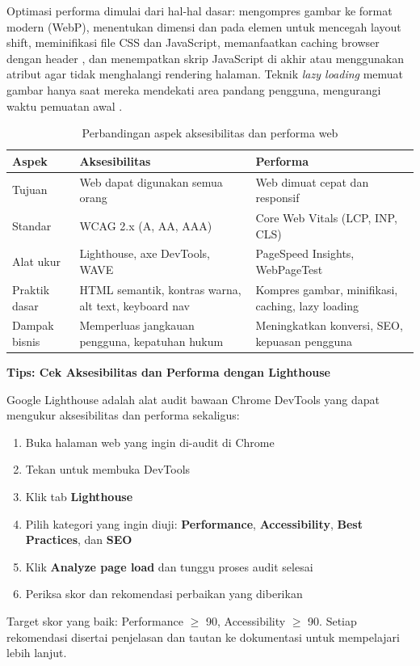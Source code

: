 Optimasi performa dimulai dari hal-hal dasar: mengompres gambar ke format modern (WebP), menentukan dimensi  dan  pada elemen  untuk mencegah layout shift, meminifikasi file CSS dan JavaScript, memanfaatkan caching browser dengan header , dan menempatkan skrip JavaScript di akhir  atau menggunakan atribut  agar tidak menghalangi rendering halaman. Teknik \textit{lazy loading} memuat gambar hanya saat mereka mendekati area pandang pengguna, mengurangi waktu pemuatan awal \cite{mdnToolsTesting}.

\begin{table}[htbp]
\centering
\begin{tabular}{|P{2.5cm}|P{4.5cm}|P{4.5cm}|}
\hline
\textbf{Aspek} & \textbf{Aksesibilitas} & \textbf{Performa} \\
\hline
Tujuan & Web dapat digunakan semua orang & Web dimuat cepat dan responsif \\
\hline
Standar & WCAG 2.x (A, AA, AAA) & Core Web Vitals (LCP, INP, CLS) \\
\hline
Alat ukur & Lighthouse, axe DevTools, WAVE & PageSpeed Insights, WebPageTest \\
\hline
Praktik dasar & HTML semantik, kontras warna, alt text, keyboard nav & Kompres gambar, minifikasi, caching, lazy loading \\
\hline
Dampak bisnis & Memperluas jangkauan pengguna, kepatuhan hukum & Meningkatkan konversi, SEO, kepuasan pengguna \\
\hline
\end{tabular}
\caption{Perbandingan aspek aksesibilitas dan performa web}
\end{table}

\begin{catatan}
\textbf{Tips: Cek Aksesibilitas dan Performa dengan Lighthouse}

Google Lighthouse adalah alat audit bawaan Chrome DevTools yang dapat mengukur aksesibilitas dan performa sekaligus:
\begin{enumerate}
  \item Buka halaman web yang ingin di-audit di Chrome
  \item Tekan  untuk membuka DevTools
  \item Klik tab \textbf{Lighthouse}
  \item Pilih kategori yang ingin diuji: \textbf{Performance}, \textbf{Accessibility}, \textbf{Best Practices}, dan \textbf{SEO}
  \item Klik \textbf{Analyze page load} dan tunggu proses audit selesai
  \item Periksa skor dan rekomendasi perbaikan yang diberikan
\end{enumerate}
Target skor yang baik: Performance $\geq$ 90, Accessibility $\geq$ 90. Setiap rekomendasi disertai penjelasan dan tautan ke dokumentasi untuk mempelajari lebih lanjut.
\end{catatan}


